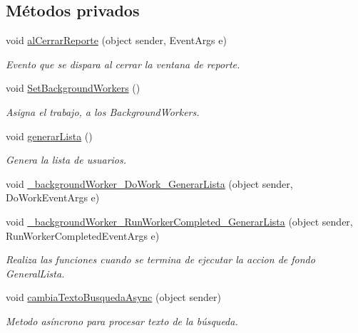 \subsection*{Métodos privados}
\begin{DoxyCompactItemize}
\item 
void \hyperlink{class_proyecto___integrador__3_1_1_main_window_a49f98bf3443dff4b67a632a88876c5ea}{al\-Cerrar\-Reporte} (object sender, Event\-Args e)
\begin{DoxyCompactList}\small\item\em Evento que se dispara al cerrar la ventana de reporte. \end{DoxyCompactList}\item 
void \hyperlink{class_proyecto___integrador__3_1_1_main_window_a1d3507f367b67fc0d78b419104022d8b}{Set\-Background\-Workers} ()
\begin{DoxyCompactList}\small\item\em Asigna el trabajo, a los Background\-Workers. \end{DoxyCompactList}\item 
void \hyperlink{class_proyecto___integrador__3_1_1_main_window_a524b3904582404e525a70f8ceac96e7d}{generar\-Lista} ()
\begin{DoxyCompactList}\small\item\em Genera la lista de usuarios. \end{DoxyCompactList}\item 
void \hyperlink{class_proyecto___integrador__3_1_1_main_window_ab249799e7bcd0f69fb202e5d0cdf130f}{\-\_\-background\-Worker\-\_\-\-Do\-Work\-\_\-\-Generar\-Lista} (object sender, Do\-Work\-Event\-Args e)
\item 
void \hyperlink{class_proyecto___integrador__3_1_1_main_window_a1199d4e141bb0903e06b0d32afe5e00b}{\-\_\-background\-Worker\-\_\-\-Run\-Worker\-Completed\-\_\-\-Generar\-Lista} (object sender, Run\-Worker\-Completed\-Event\-Args e)
\begin{DoxyCompactList}\small\item\em Realiza las funciones cuando se termina de ejecutar la accion de fondo General\-Lista. \end{DoxyCompactList}\item 
void \hyperlink{class_proyecto___integrador__3_1_1_main_window_ab610c382bc2fb0c9dff1bbb26684a526}{cambia\-Texto\-Busqueda\-Async} (object sender)
\begin{DoxyCompactList}\small\item\em Metodo asíncrono para procesar texto de la búsqueda. \end{DoxyCompactList}\item 

\end{DoxyCompactItemize}
